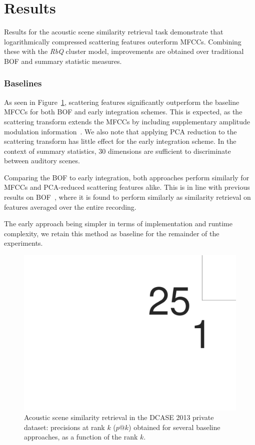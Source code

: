 \documentclass[smallextended]{svjour3}
\begin{document}
\section{Results \label{sec:results}}

Results for the acoustic scene similarity retrieval task demonstrate that logarithmically compressed scattering features outerform MFCCs.
Combining these with the \emph{RbQ} cluster model, improvements are obtained over traditional BOF and summary statistic measures.

\subsubsection*{Baselines}

As seen in Figure~\ref{fig:ASS_-1}, scattering features significantly outperform the baseline MFCCs for both BOF and early integration schemes.
This is expected, as the scattering transform extends the MFCCs by including supplementary amplitude modulation information~\cite{Anden2014}.
We also note that applying PCA reduction to the scattering transform has little effect for the early integration scheme.
In the context of summary statistics, $30$ dimensions are sufficient to discriminate between auditory scenes.

Comparing the BOF to early integration, both approaches perform similarly for MFCCs and PCA-reduced scattering features alike.
This is in line with previous results on BOF~\cite{lagrange:hal-01082501}, where it is found to perform similarly as similarity retrieval on features averaged over the entire recording.

The early approach being simpler in terms of implementation and runtime complexity, we retain this method as baseline for the remainder of the experiments.

\begin{figure}[t]
\begin{center}
\includegraphics[width=\columnwidth]{figures/baselines}
\caption{Acoustic scene similarity retrieval in the DCASE 2013 private dataset: precisions at rank $k$ ($p@k$) obtained for several baseline approaches, as a function of the rank $k$.}
\label{fig:ASS_-1}
\end{center}
\end{figure}
\end{document}

